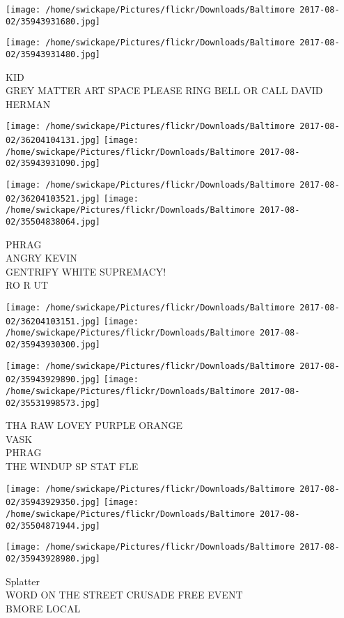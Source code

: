 \documentclass[10pt,letterpaper]{article}
\begin{document}
\texttt{[image: /home/swickape/Pictures/flickr/Downloads/Baltimore 2017-08-02/35943931680.jpg]}

\vspace{0.25in}
\texttt{[image: /home/swickape/Pictures/flickr/Downloads/Baltimore 2017-08-02/35943931480.jpg]}

KID\\
GREY MATTER ART SPACE PLEASE RING BELL OR CALL DAVID HERMAN\\
\pagebreak

\texttt{[image: /home/swickape/Pictures/flickr/Downloads/Baltimore 2017-08-02/36204104131.jpg]}
\texttt{[image: /home/swickape/Pictures/flickr/Downloads/Baltimore 2017-08-02/35943931090.jpg]}

\texttt{[image: /home/swickape/Pictures/flickr/Downloads/Baltimore 2017-08-02/36204103521.jpg]}
\texttt{[image: /home/swickape/Pictures/flickr/Downloads/Baltimore 2017-08-02/35504838064.jpg]}

PHRAG\\
ANGRY KEVIN\\
GENTRIFY WHITE SUPREMACY!\\
RO R UT\\
\pagebreak

\texttt{[image: /home/swickape/Pictures/flickr/Downloads/Baltimore 2017-08-02/36204103151.jpg]}
\texttt{[image: /home/swickape/Pictures/flickr/Downloads/Baltimore 2017-08-02/35943930300.jpg]}

\texttt{[image: /home/swickape/Pictures/flickr/Downloads/Baltimore 2017-08-02/35943929890.jpg]}
\texttt{[image: /home/swickape/Pictures/flickr/Downloads/Baltimore 2017-08-02/35531998573.jpg]}

THA RAW LOVEY PURPLE ORANGE\\
VASK\\
PHRAG\\
THE WINDUP SP STAT FLE\\
\pagebreak

\texttt{[image: /home/swickape/Pictures/flickr/Downloads/Baltimore 2017-08-02/35943929350.jpg]}
\texttt{[image: /home/swickape/Pictures/flickr/Downloads/Baltimore 2017-08-02/35504871944.jpg]}

\texttt{[image: /home/swickape/Pictures/flickr/Downloads/Baltimore 2017-08-02/35943928980.jpg]}

Splatter\\
WORD ON THE STREET CRUSADE FREE EVENT\\
BMORE LOCAL\\
\pagebreak
\end{document}
